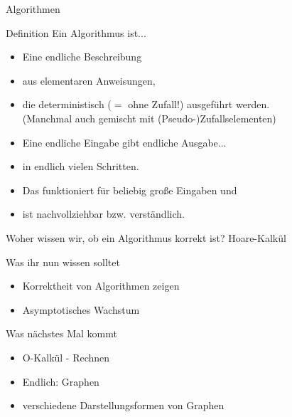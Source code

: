 \framePrevEpisode

\begin{frame}{Algorithmen}
	\begin{block}{Definition}
		Ein Algorithmus ist...
		\begin{itemize}
			\item Eine endliche Beschreibung
			\item aus elementaren Anweisungen, 
			\item die deterministisch ($=$ ohne Zufall!) ausgeführt werden.\\
				{\small (Manchmal auch gemischt mit (Pseudo-)Zufallselementen)}
			\item Eine endliche Eingabe gibt endliche Ausgabe...
			\item in endlich vielen Schritten.
			\item Das funktioniert für beliebig große Eingaben und
			\item ist nachvollziehbar bzw. verständlich.
		\end{itemize}
	\end{block}
	\pause
	Woher wissen wir, ob ein Algorithmus korrekt ist? \pause \impl Hoare-Kalkül
\end{frame}






\begin{frame}	
	\begin{block}{Was ihr nun wissen solltet}
		\begin{itemize}
			\item Korrektheit von Algorithmen zeigen
			\item Asymptotisches Wachstum
		\end{itemize}
	\end{block}

	
	\begin{block}{Was nächstes Mal kommt}
		\begin{itemize}
			\item O-Kalkül - Rechnen
			\item Endlich: Graphen
			\item verschiedene Darstellungsformen von Graphen
		\end{itemize}
	\end{block}
\end{frame}

